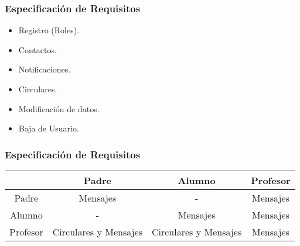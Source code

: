 \begin{frame}
	\frametitle{Especificación de Requisitos}
		\begin{itemize}
			\item Registro (Roles).
			\item Contactos.
			\item Notificaciones.
			\item Circulares.
			\item Modificación de datos.
			\item Baja de Usuario.
		\end{itemize}
	\endblock{}
\end{frame}


\begin{frame}
	\frametitle{Especificación de Requisitos}
		\begin{table} [!hbt]
			\begin{center}
				\begin{tabular}{|| c | c | c | c ||}
					\hline
					\hline
					& Padre & Alumno & Profesor \\
					\hline
					Padre & Mensajes & - & Mensajes \\
					\hline
					Alumno & - & Mensajes & Mensajes \\
					\hline
					Profesor & Circulares y Mensajes & Circulares y Mensajes & Mensajes \\
					\hline
					\hline
				\end{tabular}
			\end{center}
		\end{table}
	\endblock{}
\end{frame}